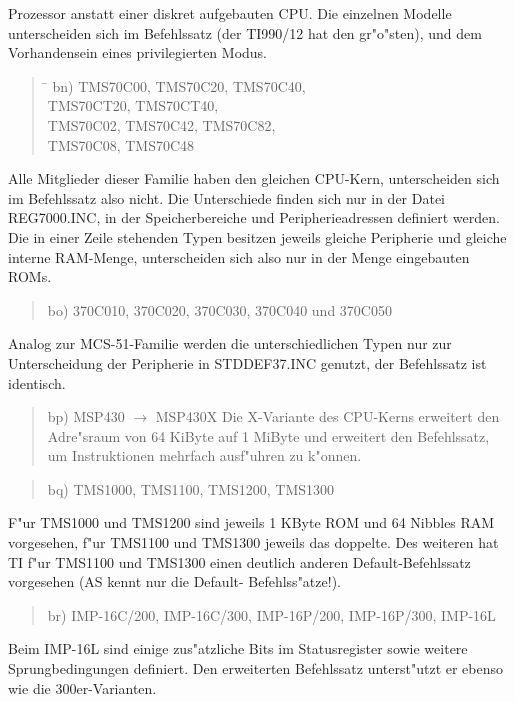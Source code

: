 \documentclass[12pt,a4paper,twoside]{report}
\begin{document}
Prozessor anstatt einer diskret aufgebauten CPU.  Die einzelnen Modelle
unterscheiden sich im Befehlssatz (der TI990/12 hat den gr"o"sten), und
dem Vorhandensein eines privilegierten Modus.
\begin{quote}
\begin{tabbing}
\hspace{0.7cm} \= \kill
bn) \> TMS70C00, TMS70C20, TMS70C40, \\
    \> TMS70CT20, TMS70CT40, \\
    \> TMS70C02, TMS70C42, TMS70C82, \\
    \> TMS70C08, TMS70C48 \\
\end{tabbing}
\end{quote}
Alle Mitglieder dieser Familie haben den gleichen CPU-Kern,
unterscheiden sich im Befehlssatz also nicht.  Die Unterschiede
finden sich nur in der Datei REG7000.INC, in der Speicherbereiche
und Peripherieadressen definiert werden.  Die in einer Zeile
stehenden  Typen besitzen jeweils gleiche Peripherie und gleiche
interne RAM-Menge, unterscheiden sich also nur in der Menge
eingebauten ROMs.
\begin{quote}
bo) 370C010, 370C020, 370C030, 370C040 und 370C050
\end{quote}
Analog zur MCS-51-Familie werden die unterschiedlichen Typen nur
zur Unterscheidung der Peripherie in STDDEF37.INC genutzt, der
Befehlssatz ist identisch.
\begin{quote}
bp) MSP430 $\rightarrow$ MSP430X
Die X-Variante des CPU-Kerns erweitert den Adre"sraum von 64
KiByte auf 1 MiByte und erweitert den Befehlssatz, um
Instruktionen mehrfach ausf"uhren zu k"onnen.
\end{quote}
\begin{quote}
bq) TMS1000, TMS1100, TMS1200, TMS1300
\end{quote}
F"ur TMS1000 und TMS1200 sind jeweils 1 KByte ROM und 64 Nibbles
RAM vorgesehen, f"ur TMS1100 und TMS1300 jeweils das doppelte.  Des
weiteren hat TI f"ur TMS1100 und TMS1300 einen deutlich anderen
Default-Befehlssatz vorgesehen (AS kennt nur die Default-
Befehlss"atze!).
\begin{quote}
br) IMP-16C/200, IMP-16C/300, IMP-16P/200, IMP-16P/300, IMP-16L
\end{quote}
Beim IMP-16L sind einige zus"atzliche Bits im Statusregister sowie
weitere Sprungbedingungen definiert. Den erweiterten Befehlssatz 
unterst"utzt er ebenso wie die 300er-Varianten.
\end{document}
